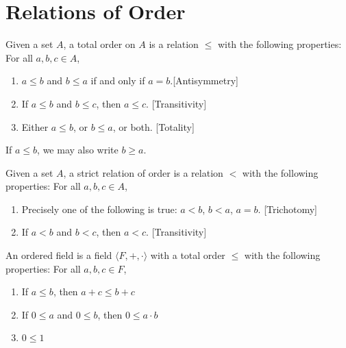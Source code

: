 \documentclass[crop=false,class=book,oneside]{standalone}
\begin{document}
    \section{Relations of Order}
        \begin{definition}
            Given a set $A$, a total order on $A$ is a relation $\leq$
            with the following properties: For all $a,b,c\in A$,
            \begin{enumerate}
                \item $a\leq b$ and $b\leq a$ if and only
                      if $a=b$.\hfill [Antisymmetry]
                \item If $a\leq{b}$ and $b\leq c$, then
                      $a\leq{c}$. \hfill [Transitivity]
                \item Either $a\leq b$, or $b\leq a$,
                      or both. \hfill [Totality]
            \end{enumerate}
        \end{definition}
            \begin{remark}
            If $a\leq b$, we may also write $b\geq a$.
            \end{remark}
            \begin{definition}
            Given a set $A$, a strict relation of order is a relation $<$ with the following properties: For all $a,b,c\in A$,
            \begin{enumerate}
                \item Precisely one of the following is true: $a<b$, $b<a$, $a=b$. \hfill [Trichotomy]
                \item If $a<b$ and $b<c$, then $a<c$. \hfill [Transitivity]
            \end{enumerate}
            \end{definition}
            \begin{definition}
            An ordered field is a field $\langle F,+,\cdot \rangle$ with a total order $\leq$ with the following properties: For all $a,b,c\in F$,
            \begin{enumerate}
                \item If $a\leq b$, then $a+c\leq b+c$
                \item If $0 \leq a$ and $0\leq b$, then $0\leq a\cdot b$
                \item $0\leq 1$
            \end{enumerate}
            \end{definition}
\end{document}
